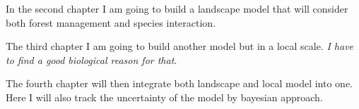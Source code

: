 \documentclass[a4paper,12pt,twoside]{article}
\begin{document}
In the second chapter I am going to build a landscape model that will consider both forest management and species interaction.

The third chapter I am going to build another model but in a local scale. \textit{I have to find a good biological reason for that}.

The fourth chapter will then integrate both landscape and local model into one. Here I will also track the uncertainty of the model by bayesian approach.  
\end{document}
